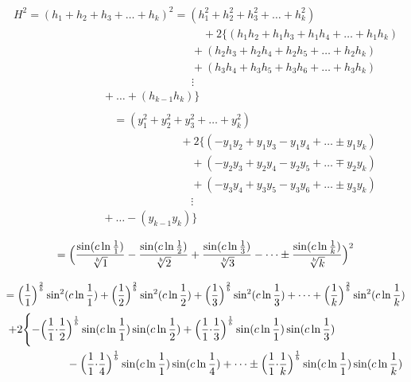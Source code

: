 \documentclass{amsart}
\begin{document}
	\[ \begin{array}{c}
	H^2 = (h_1 + h_2 + h_3 + \dots + h_k)^2 = (h_1^2 + h_2^2 + h_3^2 + \dots + h_k^2) \\
	\qquad\qquad\qquad\qquad\qquad\qquad\qquad\qquad\quad + 2\{(h_1h_2 + h_1h_3 + h_1h_4 + \dots + h_{1}h_{k}) \\ 
	\qquad\qquad\qquad\qquad\qquad\qquad\qquad\qquad + (h_2h_3 + h_2h_4 + h_2h_5 + \dots + h_2h_{k}) \\ 
	\qquad\qquad\qquad\qquad\qquad\qquad\qquad\qquad + (h_3h_4 + h_3h_5 + h_3h_6 + \dots + h_3h_{k}) \\ 
	\qquad\qquad\qquad\qquad\qquad\qquad\qquad\qquad \vdots \\
	\qquad\qquad\qquad\qquad + \dots + (h_{k-1}h_{k}) \} \\ 
	\end{array} \]
	\[ \begin{array}{c}
		\qquad\qquad\qquad\quad = (y_1^2 + y_2^2 + y_3^2 + \dots + y_k^2) \\ 
		\qquad\qquad\qquad\qquad\qquad\qquad\quad + 2\{(-y_1y_2 + y_1y_3 - y_1y_4 + \dots \pm y_{1}y_{k}) \\ 
		\qquad\qquad\qquad\qquad\qquad\qquad\qquad + (-y_2y_3 + y_2y_4 - y_2y_5 + \dots \mp y_{2}y_{k}) \\ 
		\qquad\qquad\qquad\qquad\qquad\qquad\qquad + (-y_3y_4 + y_3y_5 - y_3y_6 + \dots \pm y_{3}y_{k}) \\ 
		\qquad\qquad\qquad\qquad\qquad\qquad\qquad \vdots \\
		\qquad\qquad\qquad + \dots - (y_{k-1}y_{k}) \} \\
	\end{array} \]
	\[\]
	\[\]
	\[ = \Bigl( \frac{\sin({c\ln \frac{1}{1}})}{\sqrt[b]{1}} - \frac{\sin({c\ln \frac{1}{2}})}{\sqrt[b]{2}} + \frac{\sin({c\ln \frac{1}{3}})}{\sqrt[b]{3}} - \dots \pm \frac{\sin({c\ln \frac{1}{k}})}{\sqrt[b]{k}} \Bigr)^2 \]
	\[\]
	\[\]
	\[ = \Bigl( \frac{1}{1} \Bigr)^{\frac2b}\sin^2({c \ln \frac{1}{1}}) + \Bigl( \frac{1}{2} \Bigr)^{\frac2b}\sin^2({c \ln \frac{1}{2}}) + \Bigl( \frac{1}{3} \Bigr)^{\frac2b}\sin^2({c \ln \frac{1}{3}}) + \dots + \Bigl( \frac{1}{k} \Bigr)^{\frac2b}\sin^2({c \ln \frac{1}{k}}) \]
	\[
	\begin{aligned}
		+2\Biggl\{ -\Bigl( \frac{1}{1} {\cdot} \frac{1}{2}& \Bigr)^\frac1b \sin(c \ln \frac{1}{1}) \sin(c \ln \frac{1}{2}) + \Bigl( \frac{1}{1} {\cdot} \frac{1}{3} \Bigr)^\frac1b \sin(c \ln \frac{1}{1}) \sin(c \ln \frac{1}{3}) \\ 
		& - \Bigl( \frac{1}{1} {\cdot} \frac{1}{4} \Bigr)^\frac1b \sin(c \ln \frac{1}{1}) \sin(c \ln \frac{1}{4}) + \dots \pm \Bigl( \frac{1}{1} {\cdot} \frac{1}{k} \Bigr)^\frac1b \sin(c \ln \frac{1}{1}) \sin(c \ln \frac{1}{k}) \\ 		
	\end{aligned}
	\]
\end{document}
